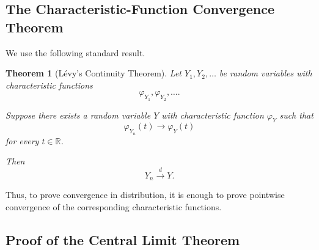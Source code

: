 \documentclass[11pt]{article}
\theoremstyle{definition}
\theoremstyle{plain}
\newtheorem{theorem}{Theorem}
\theoremstyle{remark}
\begin{document}
\subsection*{The Characteristic-Function Convergence Theorem}

We use the following standard result.

\begin{theorem}[L\'evy's Continuity Theorem]
\label{thm:levy-continuity}
Let $Y_1,Y_2,\ldots$ be random variables with characteristic functions
\[
\varphi_{Y_1},\varphi_{Y_2},\ldots.
\]

Suppose there exists a random variable $Y$ with characteristic function
$\varphi_Y$ such that
\[
\varphi_{Y_n}(t)
\longrightarrow
\varphi_Y(t)
\]
for every $t\in\mathbb{R}$.

Then
\[
Y_n\xrightarrow{d}Y.
\]
\end{theorem}

Thus, to prove convergence in distribution, it is enough to prove
pointwise convergence of the corresponding characteristic functions.


\subsection*{Proof of the Central Limit Theorem}
\end{document}
